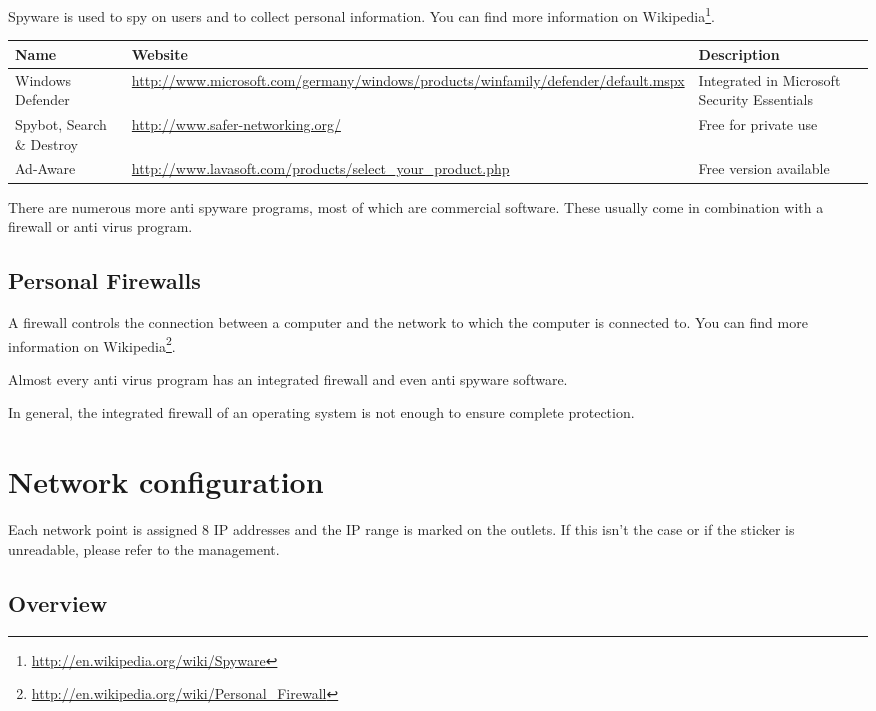 \documentclass[a4paper,12pt]{scrartcl}
\begin{document}
Spyware is used to spy on users and to collect personal information. You can find more information on Wikipedia\footnote{\url{http://en.wikipedia.org/wiki/Spyware}}.

\begin{center}
  \begin{tabularx}{\linewidth}{|p{.18\linewidth}Xp{.3\linewidth}|}
    \hline
    Name & Website & Description\\
    \hline \hline
    Windows Defender & \url{http://www.microsoft.com/germany/windows/products/winfamily/defender/default.mspx} & Integrated in Microsoft Security Essentials\\
    \hline
    Spybot, Search \& Destroy & \url{http://www.safer-networking.org/} & Free for private use\\
    \hline
    Ad-Aware & \url{http://www.lavasoft.com/products/select\_your\_product.php} & Free version available\\
    \hline
  \end{tabularx}
\end{center}

There are numerous more anti spyware programs, most of which are commercial software. These usually come in combination with a firewall or anti virus program.

\subsection*{Personal Firewalls}

A firewall controls the connection between a computer and the network to which the computer is connected to. You can find more information on Wikipedia\footnote{\url{http://en.wikipedia.org/wiki/Personal\_Firewall}}.

Almost every anti virus program has an integrated firewall and even anti spyware software.

In general, the integrated firewall of an operating system is not enough to ensure complete protection.
\newpage

\section*{Network configuration}

Each network point is assigned 8 IP addresses and the IP range is marked on the outlets. If this isn't the case or if the sticker is unreadable, please refer to the management.

\subsection*{Overview}
\end{document}
